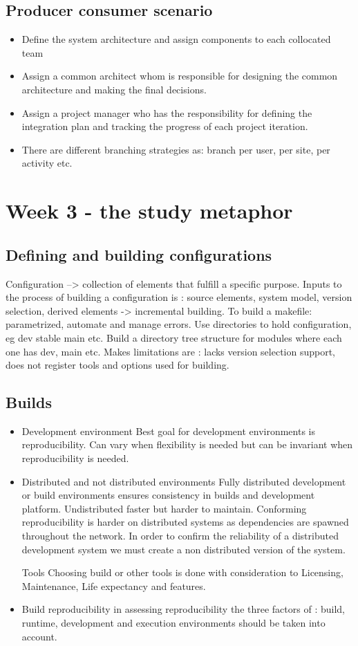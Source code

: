 \subsection{Producer consumer scenario}
\begin{itemize}
    \item Define the system architecture and assign components to each collocated team
    \item Assign a common architect whom is responsible for designing the common architecture and making the final decisions.
    \item Assign a project manager who has the responsibility for defining the integration plan and tracking the progress of each project iteration.
    \item There are different branching strategies as: branch per user, per site, per activity etc.
\end{itemize}

\section{ Week 3 - the study metaphor}
\subsection{Defining and building configurations} 
Configuration --> collection of elements that fulfill a specific purpose. Inputs to the process of building a configuration is : source elements, system model, version selection, derived elements -> incremental building.
To build a makefile: parametrized, automate and manage errors. Use directories to hold configuration, eg dev stable main etc. Build a directory tree structure for modules where each one has dev, main etc.
Makes limitations are : lacks version selection support, does not register tools and options used for building.

\subsection{Builds}
\begin{itemize}
    \item Development environment Best goal for development environments is reproducibility. Can vary when flexibility is needed but can be invariant when reproducibility is needed.
    \item Distributed and not distributed environments Fully distributed development or build environments ensures consistency in builds and development platform. Undistributed faster but harder to maintain.
    Conforming reproducibility is harder on distributed systems as dependencies are spawned throughout the network. In order to confirm the reliability of a distributed development system we must create a non distributed version of the system.
    \item[Tools] Choosing build or other tools is done with consideration to Licensing, Maintenance, Life expectancy and features. 
    \item Build reproducibility  in assessing reproducibility the three factors of : build, runtime, development and execution environments should be taken into account.
\end{itemize}

